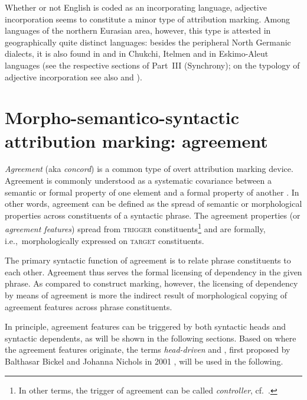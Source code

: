 Whether or not English is coded as an incorporating language, adjective incorporation seems to constitute a minor type of attribution marking. Among languages of the northern Eurasian area, however, this type is attested in geographically quite distinct languages: besides the peripheral North Germanic dialects, it is also found in  and in Chukchi, Itelmen and in Eskimo-Aleut languages (see the respective sections of Part~III (Synchrony); on the typology of adjective incorporation see also \cite[225–236]{dahl2004a} and \cite[28–29]{dahl2015a}).

\section[Agreement marking]{Morpho-semantico-syntactic attribution marking: agreement}

\emph{Agreement} (aka \emph{concord}) is a common type of overt attribution marking device. Agreement is commonly understood as a systematic covariance between a semantic or formal property of one element and a formal property of another \citep[610]{steele1978}. In other words, agreement can be defined as the spread of semantic or morphological properties across constituents of a syntactic phrase. The agreement properties (or \emph{agreement features}) spread from \textsc{trigger} constituents\footnote{In other terms, the trigger of agreement can be called \emph{controller}, cf.~\citealt{corbett2006}.} and are formally, i.e.,~morphologically expressed on \textsc{target} constituents.

The primary syntactic function of agreement is to relate phrase constituents to each other. Agreement thus serves the formal licensing of dependency in the given phrase. As compared to construct marking, however, the licensing of dependency by means of agreement is more the indirect result of morphological copying of agreement features across phrase constituents.

In principle, agreement features can be triggered by both syntactic heads and syntactic dependents, as will be shown in the following sections. Based on where the agreement features originate, the terms \emph{head\hyp{}driven} and \emph{}, first proposed by Balthasar Bickel and Johanna Nichols in 2001 \citep[published as][]{bickel-etal2007}, will be used in the following.

